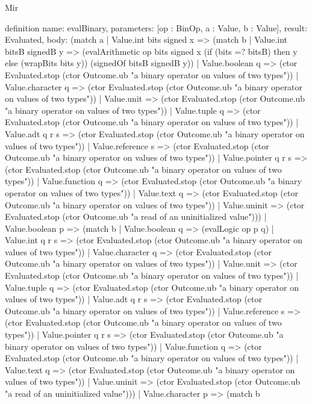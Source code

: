 \begin{lexlean}{Mir}
\begin{semanticmodule}
definition{
  name: evalBinary,
  parameters: [op : BinOp, a : Value, b : Value],
  result: Evaluated,
  body: (match a
    | Value.int bits signed x => (match b
      | Value.int bitsB signedB y => (evalArithmetic op bits signed x (if (bits =? bitsB) then y else (wrapBits bits y)) (signedOf bitsB signedB y))
      | Value.boolean q => (ctor Evaluated.stop (ctor Outcome.ub "a binary operator on values of two types"))
      | Value.character q => (ctor Evaluated.stop (ctor Outcome.ub "a binary operator on values of two types"))
      | Value.unit => (ctor Evaluated.stop (ctor Outcome.ub "a binary operator on values of two types"))
      | Value.tuple q => (ctor Evaluated.stop (ctor Outcome.ub "a binary operator on values of two types"))
      | Value.adt q r s => (ctor Evaluated.stop (ctor Outcome.ub "a binary operator on values of two types"))
      | Value.reference s => (ctor Evaluated.stop (ctor Outcome.ub "a binary operator on values of two types"))
      | Value.pointer q r s => (ctor Evaluated.stop (ctor Outcome.ub "a binary operator on values of two types"))
      | Value.function q => (ctor Evaluated.stop (ctor Outcome.ub "a binary operator on values of two types"))
      | Value.text q => (ctor Evaluated.stop (ctor Outcome.ub "a binary operator on values of two types"))
      | Value.uninit => (ctor Evaluated.stop (ctor Outcome.ub "a read of an uninitialized value")))
    | Value.boolean p => (match b
      | Value.boolean q => (evalLogic op p q)
      | Value.int q r s => (ctor Evaluated.stop (ctor Outcome.ub "a binary operator on values of two types"))
      | Value.character q => (ctor Evaluated.stop (ctor Outcome.ub "a binary operator on values of two types"))
      | Value.unit => (ctor Evaluated.stop (ctor Outcome.ub "a binary operator on values of two types"))
      | Value.tuple q => (ctor Evaluated.stop (ctor Outcome.ub "a binary operator on values of two types"))
      | Value.adt q r s => (ctor Evaluated.stop (ctor Outcome.ub "a binary operator on values of two types"))
      | Value.reference s => (ctor Evaluated.stop (ctor Outcome.ub "a binary operator on values of two types"))
      | Value.pointer q r s => (ctor Evaluated.stop (ctor Outcome.ub "a binary operator on values of two types"))
      | Value.function q => (ctor Evaluated.stop (ctor Outcome.ub "a binary operator on values of two types"))
      | Value.text q => (ctor Evaluated.stop (ctor Outcome.ub "a binary operator on values of two types"))
      | Value.uninit => (ctor Evaluated.stop (ctor Outcome.ub "a read of an uninitialized value")))
    | Value.character p => (match b
}
\end{semanticmodule}
\end{lexlean}
